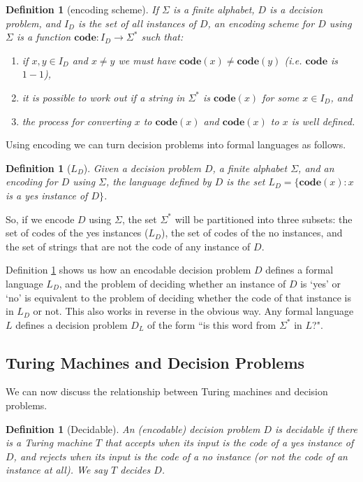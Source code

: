 \documentclass{article}
\theoremstyle{plain}
\newtheorem{definition}[theorem]{Definition}{\bfseries}{\upshape}
\begin{document}
\begin{definition}[encoding scheme]
If $\Sigma$ is a finite alphabet, $D$ is a decision problem, and $I_D$ is the set of all instances of $D$, an encoding scheme for $D$ using $\Sigma$ is a function $\mathbf{code}: I_D\to \Sigma^*$ such that:
\begin{enumerate}
\item if $x,y\in I_D$ and $x\neq y$ we must have $\mathbf{code}(x)\neq \mathbf{code}(y)$ (i.e. $\mathbf{code}$ is $1-1$),
\item it is possible to work out if a string in $\Sigma^*$ is $\mathbf{code}(x)$ for some $x\in I_D$, and 
\item the process for converting $x$ to $\mathbf{code}(x)$ and $\mathbf{code}(x)$ to $x$ is well defined. 
\end{enumerate}
\end{definition}

Using encoding we can turn decision problems into formal languages as follows.
\begin{definition}[$L_D$]\label{D:LD}
Given a decision problem $D$, a finite alphabet $\Sigma$, and an encoding for $D$ using $\Sigma$, the language defined by $D$ is the set $L_D=\{\textbf{code}(x):x$ is a yes instance of $D\}$.
\end{definition}

So, if we encode $D$ using $\Sigma$, the set $\Sigma^*$ will be partitioned into three subsets: the set of codes of the yes instances ($L_D$), the set of codes of the no instances, and the set of strings that are not the code of any instance of $D$. 

Definition \ref{D:LD} shows us how an encodable decision problem $D$ defines a formal language $L_D$, and the problem of deciding whether an instance of $D$ is `yes' or `no' is equivalent to the problem of deciding whether the code of that instance is in $L_D$ or not. This also works in reverse in the obvious way. Any formal language $L$ defines a decision problem $D_L$ of the form ``is this word from $\Sigma^*$ in $L$?". 


\subsection{Turing Machines and Decision Problems}
We can now discuss the relationship between Turing machines and decision problems. 

\begin{definition}[Decidable]\label{D:dec}
An (encodable) decision problem $D$ is decidable if there is a Turing machine $T$ that accepts when its input is the code of a yes instance of $D$, and rejects when its input is the code of a no instance (or not the code of an instance at all). We say $T$ decides $D$.
\end{definition}
\end{document}
